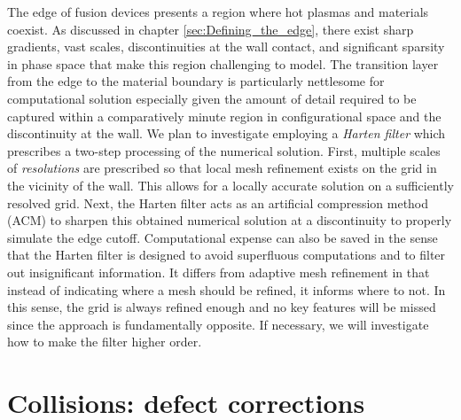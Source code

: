 \documentclass[11pt,titlepage]{report}
\begin{document}
\indent\indent The edge of fusion devices presents a region where hot plasmas and materials coexist. As discussed in chapter \ref{sec:Defining_the_edge}, there exist sharp gradients, vast scales, discontinuities at the wall contact, and significant sparsity in phase space that make this region challenging to model. The transition layer from the edge to the material boundary is particularly nettlesome for computational solution especially given the amount of detail required to be captured within a comparatively minute region in configurational space and the discontinuity at the wall. We plan to investigate employing a \emph{Harten filter} which prescribes a two-step processing of the numerical solution. First, multiple scales of \emph{resolutions} are prescribed so that local mesh refinement exists on the grid in the vicinity of the wall. This allows for a locally accurate solution on a sufficiently resolved grid. Next, the Harten filter acts as an artificial compression method (ACM) \cite{Harten78} to sharpen this obtained numerical solution at a discontinuity to properly simulate the edge cutoff. Computational expense can also be saved in the sense that the Harten filter is designed to avoid superfluous computations and to filter out insignificant information. It differs from adaptive mesh refinement in that instead of indicating where a mesh should be refined, it informs where to not. In this sense, the grid is always refined enough and no key features will be missed since the approach is fundamentally opposite. If necessary, we will investigate how to make the filter higher order.

\section{Collisions: defect corrections}
\end{document}
